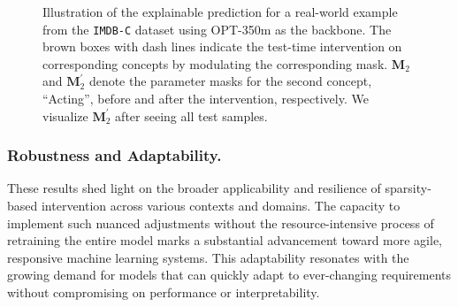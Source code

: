 \documentclass[letterpaper]{article} %
\begin{document}
\begin{figure}[t]
  \centering
  \caption{Illustration of the explainable prediction for a real-world example from the \texttt{IMDB-C} dataset using OPT-350m as the backbone. The brown boxes with dash lines indicate the test-time intervention on corresponding concepts by modulating the corresponding mask. $\bm{M}_2$ and $\bm{M}_2^\prime$ denote the parameter masks for the second concept, ``Acting'', before and after the intervention, respectively. We visualize $\bm{M}_2^\prime$ after seeing all test samples.}
  \label{fig:inter}
\end{figure}

\subsubsection{Robustness and Adaptability.}
These results shed light on the broader applicability and resilience of sparsity-based intervention across various contexts and domains. The capacity to implement such nuanced adjustments without the resource-intensive process of retraining the entire model marks a substantial advancement toward more agile, responsive machine learning systems. This adaptability resonates with the growing demand for models that can quickly adapt to ever-changing requirements without compromising on performance or interpretability.
\end{document}
